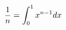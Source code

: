 \documentclass[preview]{standalone}
\begin{document}
\begin{align*}
\special{dvisvgm:raw <g id='unique000'>}\dfrac{1}{n}=\displaystyle\int_0^1x^{n-1}dx\special{dvisvgm:raw </g>}
\end{align*}
\end{document}
